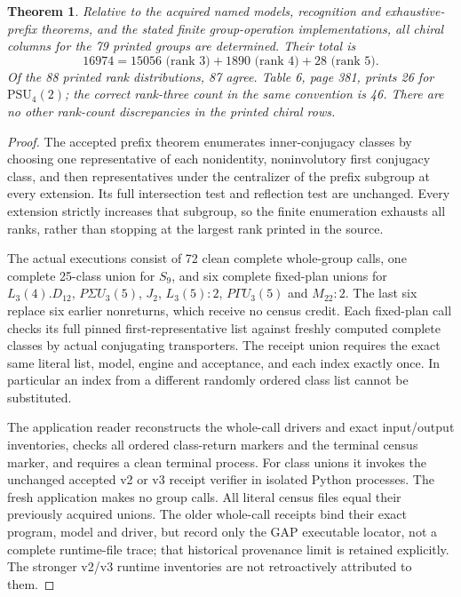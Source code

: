 \documentclass[10pt]{article}
\newtheorem{theorem}{Theorem}\newtheorem{lemma}{Lemma}
\begin{document}
\begin{theorem}
Relative to the acquired named models, recognition and exhaustive-prefix
theorems, and the stated finite group-operation implementations, all
chiral columns for the 79 printed groups are determined. Their total is
\[
 16974=15056\text{ (rank 3)}+1890\text{ (rank 4)}+28\text{ (rank 5)}.
\]
Of the 88 printed rank distributions, 87 agree. Table 6, page 381,
prints 26 for $\mathrm{PSU}_4(2)$; the correct rank-three count in the
same convention is 46. There are no other rank-count discrepancies in
the printed chiral rows.
\end{theorem}
\begin{proof}
The accepted prefix theorem enumerates inner-conjugacy classes by
choosing one representative of each nonidentity, noninvolutory first
conjugacy class, and then representatives under the centralizer of the
prefix subgroup at every extension. Its full intersection test and
reflection test are unchanged. Every extension strictly increases that
subgroup, so the finite enumeration exhausts all ranks, rather than
stopping at the largest rank printed in the source.

The actual executions consist of 72 clean complete whole-group calls,
one complete 25-class union for $S_9$, and six complete fixed-plan unions
for $L_3(4).D_{12}$, $P\Sigma U_3(5)$, $J_2$, $L_3(5):2$,
$P\Gamma U_3(5)$ and $M_{22}:2$. The last six replace six earlier
nonreturns, which receive no census credit. Each fixed-plan call checks
its full pinned first-representative list against freshly computed
complete classes by actual conjugating transporters. The receipt union
requires the exact same literal list, model, engine and acceptance, and
each index exactly once. In particular an index from a different
randomly ordered class list cannot be substituted.

The application reader reconstructs the whole-call drivers and exact
input/output inventories, checks all ordered class-return markers and
the terminal census marker, and requires a clean terminal process. For
class unions it invokes the unchanged accepted v2 or v3 receipt verifier
in isolated Python processes. The fresh application makes no group calls.
All literal census files equal their previously acquired unions. The
older whole-call receipts bind their exact program, model and driver,
but record only the GAP executable locator, not a complete runtime-file
trace; that historical provenance limit is retained explicitly. The
stronger v2/v3 runtime inventories are not retroactively attributed to them.


\end{proof}
\end{document}
